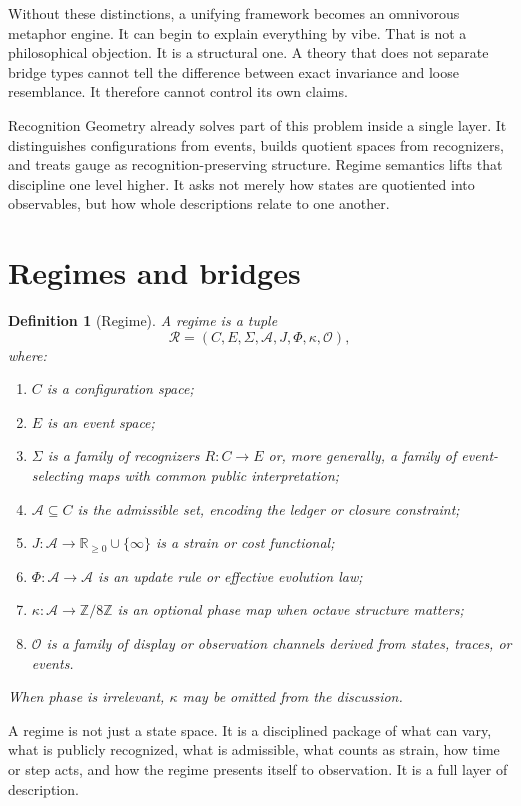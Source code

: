 \documentclass[11pt]{article}
\newtheorem{definition}{Definition}
\begin{document}
Without these distinctions, a unifying framework becomes an omnivorous metaphor engine. It can begin to explain everything by vibe. That is not a philosophical objection. It is a structural one. A theory that does not separate bridge types cannot tell the difference between exact invariance and loose resemblance. It therefore cannot control its own claims.

Recognition Geometry already solves part of this problem inside a single layer. It distinguishes configurations from events, builds quotient spaces from recognizers, and treats gauge as recognition-preserving structure. Regime semantics lifts that discipline one level higher. It asks not merely how states are quotiented into observables, but how whole descriptions relate to one another.

\section{Regimes and bridges}

\begin{definition}[Regime]
A regime is a tuple
\[
\mathcal{R}=(C,E,\Sigma,\mathcal{A},J,\Phi,\kappa,\mathcal{O}),
\]
where:
\begin{enumerate}
    \item $C$ is a configuration space;
    \item $E$ is an event space;
    \item $\Sigma$ is a family of recognizers $R:C\to E$ or, more generally, a family of event-selecting maps with common public interpretation;
    \item $\mathcal{A}\subseteq C$ is the admissible set, encoding the ledger or closure constraint;
    \item $J:\mathcal{A}\to \mathbb{R}_{\ge 0}\cup\{\infty\}$ is a strain or cost functional;
    \item $\Phi:\mathcal{A}\to \mathcal{A}$ is an update rule or effective evolution law;
    \item $\kappa:\mathcal{A}\to \mathbb{Z}/8\mathbb{Z}$ is an optional phase map when octave structure matters;
    \item $\mathcal{O}$ is a family of display or observation channels derived from states, traces, or events.
\end{enumerate}
When phase is irrelevant, $\kappa$ may be omitted from the discussion.
\end{definition}

A regime is not just a state space. It is a disciplined package of what can vary, what is publicly recognized, what is admissible, what counts as strain, how time or step acts, and how the regime presents itself to observation. It is a full layer of description.
\end{document}
